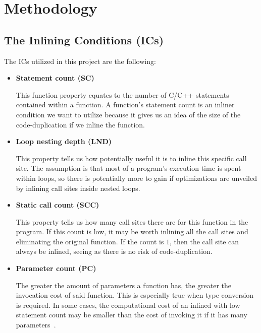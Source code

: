
\clearpage
\section{Methodology}
\label{sec:methodology}


\subsection{The Inlining Conditions (ICs)}
\label{sub:meth:inlining_conditions}

The ICs utilized in this project are the following:

\begin{itemize}

	\item \textbf{Statement count (SC)}

This function property equates to the number of C/C++ statements contained
within a function. A function's statement count is an inliner condition we want
to utilize because it gives us an idea of the size of the code-duplication if we
inline the function.

	\item \textbf{Loop nesting depth (LND)}

This property tells us how potentially useful it is to inline this specific call
site. The assumption is that most of a program's execution time is spent within
loops, so there is potentially more to gain if optimizations are unveiled by
inlining call sites inside nested loops.

	\item \textbf{Static call count (SCC)}

This property tells us how many call sites there are for this function in the
program. If this count is low, it may be worth inlining all the call sites and
eliminating the original function. If the count is $1$, then the call site can
always be inlined, seeing as there is no risk of code-duplication.

	\item \textbf{Parameter count (PC)}

The greater the amount of parameters a function has, the greater the invocation
cost of said function. This is especially true when type conversion is required.
In some cases, the computational cost of an inlined with low statement count may
be smaller than the cost of invoking it if it has many
parameters~\cite{AdaptvCompilAndInlingWaterman}.


\end{itemize}
